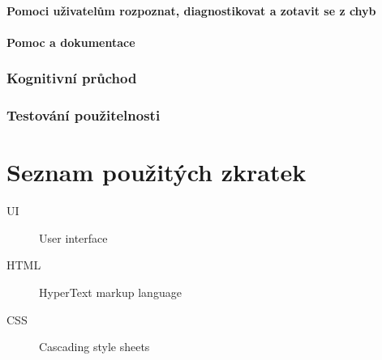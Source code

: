 \documentclass[thesis=B,czech]{FITthesis}[2012/06/26]
\begin{document}
	\subsubsection{Pomoci uživatelům rozpoznat, diagnostikovat a zotavit se z chyb}

	\subsubsection{Pomoc a dokumentace}

	\subsection{Kognitivní průchod}

	\subsection{Testování použitelnosti}

\begin{conclusion}
\end{conclusion}




\appendix

\chapter{Seznam použitých zkratek}
\begin{description}
	\item[UI] User interface
	\item[HTML] HyperText markup language
	\item[CSS] Cascading style sheets
\end{description}
\end{document}
